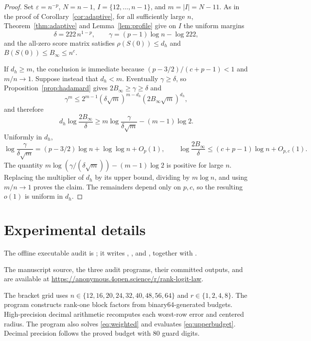 \documentclass[10pt]{article} %
\theoremstyle{definition}
\begin{document}
\begin{proof}
Set \(\varepsilon=n^{-p}\), \(N=n-1\), \(I=\{12,\ldots,n-1\}\), and
\(m=|I|=N-11\).  As in the proof of Corollary~\ref{cor:adaptive}, for all
sufficiently large \(n\), Theorem~\ref{thm:adaptive} and
Lemma~\ref{lem:profile} give on \(I\) the uniform margins
\[
 \delta=222\,n^{1-p},\qquad
 \gamma=(p-1)\log n-\log222,
\]
and the all-zero score matrix satisfies \(\rho(S(0))\le d_h\) and
\(B(S(0))\le B_\infty\le n^c\).

If \(d_h\ge m\), the conclusion is immediate because
\((p-3/2)/(c+p-1)<1\) and \(m/n\to1\).  Suppose instead that \(d_h<m\).
Eventually \(\gamma\ge\delta\), so Proposition~\ref{prop:hadamard}
gives \(2B_\infty\ge\gamma\ge\delta\) and
\[
 \gamma^m\le
 2^{m-1}(\delta\sqrt m)^{m-d_h}(2B_\infty\sqrt m)^{d_h},
\]
and therefore
\[
 d_h\log\frac{2B_\infty}{\delta}
 \ge m\log\frac{\gamma}{\delta\sqrt m}-(m-1)\log2.
\]
Uniformly in \(d_h\),
\[
 \log\frac{\gamma}{\delta\sqrt m}
 =(p-3/2)\log n+\log\log n+O_p(1),
 \qquad
 \log\frac{2B_\infty}{\delta}
 \le(c+p-1)\log n+O_{p,c}(1).
\]
The quantity
\(m\log(\gamma/(\delta\sqrt m))-(m-1)\log2\) is positive for large \(n\).
Replacing the multiplier of \(d_h\) by its upper bound, dividing by
\(m\log n\), and using \(m/n\to1\) proves the claim.  The remainders depend
only on \(p,c\), so the resulting \(o(1)\) is uniform in \(d_h\).
\end{proof}

\section{Experimental details}\label{app:experiment}

{\scriptsize\raggedright
The offline executable audit is
; it writes
,
, and
, together with
.\par}

The manuscript source, the three audit programs, their committed outputs,
and  are available at
\url{https://anonymous.4open.science/r/rank-logit-law}.

The bracket grid uses
\(n\in\{12,16,20,24,32,40,48,56,64\}\) and
\(r\in\{1,2,4,8\}\).  The program constructs rank-one block factors from
binary64-generated budgets.  High-precision decimal arithmetic recomputes each
worst-row error and centered radius.  The program also solves
\eqref{eq:weighted} and evaluates \eqref{eq:upperbudget}.  Decimal precision follows the proved budget
with 80 guard digits.
\end{document}
